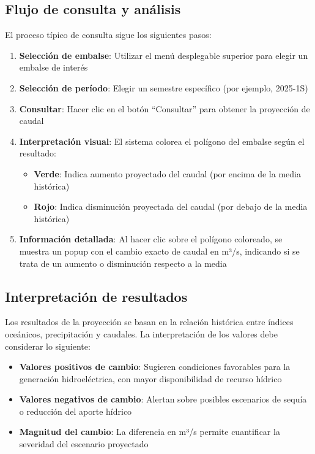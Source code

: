 \subsection{Flujo de consulta y análisis}
\label{subsec:chp7-4-2}

El proceso típico de consulta sigue los siguientes pasos:

\begin{enumerate}
    \item \textbf{Selección de embalse}: Utilizar el menú desplegable superior para elegir un embalse de interés
    \item \textbf{Selección de período}: Elegir un semestre específico (por ejemplo, 2025-1S)
    \item \textbf{Consultar}: Hacer clic en el botón ``Consultar'' para obtener la proyección de caudal
    \item \textbf{Interpretación visual}: El sistema colorea el polígono del embalse según el resultado:
    \begin{itemize}
        \item \textbf{Verde}: Indica aumento proyectado del caudal (por encima de la media histórica)
        \item \textbf{Rojo}: Indica disminución proyectada del caudal (por debajo de la media histórica)
    \end{itemize}
    \item \textbf{Información detallada}: Al hacer clic sobre el polígono coloreado, se muestra un popup con el cambio exacto de caudal en m³/s, indicando si se trata de un aumento o disminución respecto a la media
\end{enumerate}

\subsection{Interpretación de resultados}
\label{subsec:chp7-4-3}

Los resultados de la proyección se basan en la relación histórica entre índices oceánicos, precipitación y caudales. La interpretación de los valores debe considerar lo siguiente:

\begin{itemize}
    \item \textbf{Valores positivos de cambio}: Sugieren condiciones favorables para la generación hidroeléctrica, con mayor disponibilidad de recurso hídrico
    \item \textbf{Valores negativos de cambio}: Alertan sobre posibles escenarios de sequía o reducción del aporte hídrico
    \item \textbf{Magnitud del cambio}: La diferencia en m³/s permite cuantificar la severidad del escenario proyectado
\end{itemize}

